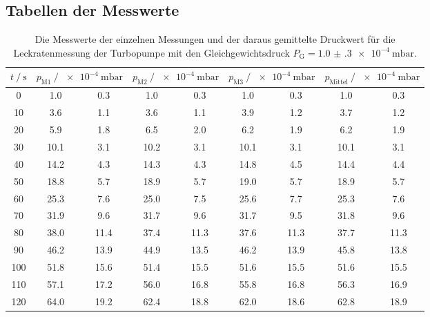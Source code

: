 \newpage
\subsection{Tabellen der Messwerte}

\begin{table}[h]
    \centering
    \caption{Die Messwerte der einzelnen Messungen und der daraus gemittelte Druckwert für die Leckratenmessung 
    der Turbopumpe mit den Gleichgewichtsdruck $P_\text{G} = \SI{1.0(3)e-4}{\milli\bar}$.}
    \label{tab:turbo_leck_1}
    \begin{tabular}{S[table-format=3.0] S @{${}\pm{}$} S S @{${}\pm{}$} S S @{${}\pm{}$} S S @{${}\pm{}$} S}
    \toprule
    {$t \mathbin{/} \si{\second} $} &  &  &  &  \\
       &  1.0 &  0.3 &  1.0 &  0.3 &  1.0 &  0.3 &  1.0 &  0.3 \\
    10  &  3.6 &  1.1 &  3.6 &  1.1 &  3.9 &  1.2 &  3.7 &  1.2 \\
    20  &  5.9 &  1.8 &  6.5 &  2.0 &  6.2 &  1.9 &  6.2 &  1.9 \\
    30  & 10.1 &  3.1 & 10.2 &  3.1 & 10.1 &  3.1 & 10.1 &  3.1 \\
    40  & 14.2 &  4.3 & 14.3 &  4.3 & 14.8 &  4.5 & 14.4 &  4.4 \\
    50  & 18.8 &  5.7 & 18.9 &  5.7 & 19.0 &  5.7 & 18.9 &  5.7 \\
    60  & 25.3 &  7.6 & 25.0 &  7.5 & 25.6 &  7.7 & 25.3 &  7.6 \\
    70  & 31.9 &  9.6 & 31.7 &  9.6 & 31.7 &  9.5 & 31.8 &  9.6 \\
    80  & 38.0 & 11.4 & 37.4 & 11.3 & 37.6 & 11.3 & 37.7 & 11.3 \\
    90  & 46.2 & 13.9 & 44.9 & 13.5 & 46.2 & 13.9 & 45.8 & 13.8 \\
    100 & 51.8 & 15.6 & 51.4 & 15.5 & 51.6 & 15.5 & 51.6 & 15.5 \\
    110 & 57.1 & 17.2 & 56.0 & 16.8 & 55.8 & 16.8 & 56.3 & 16.9 \\
    120 & 64.0 & 19.2 & 62.4 & 18.8 & 62.0 & 18.6 & 62.8 & 18.9 \\
    \bottomrule
    \end{tabular}
  \end{table}

